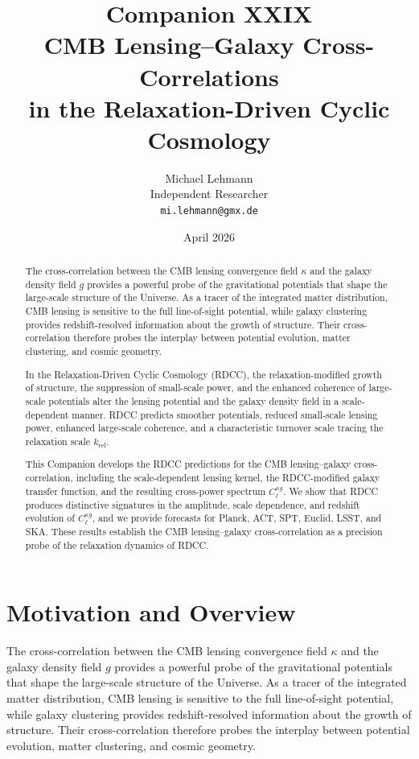 \documentclass[11pt,a4paper]{article}
\title{
\textbf{Companion XXIX}\\[4mm]
\textbf{CMB Lensing–Galaxy Cross-Correlations}\\
\textbf{in the Relaxation-Driven Cyclic Cosmology}
}
\author{
Michael Lehmann\\
Independent Researcher\\
\texttt{mi.lehmann@gmx.de}
}
\date{April 2026}
\begin{document}
\maketitle

\begin{abstract}
The cross-correlation between the CMB lensing convergence field $\kappa$ and the galaxy 
density field $g$ provides a powerful probe of the gravitational potentials that shape the 
large-scale structure of the Universe. As a tracer of the integrated matter distribution, 
CMB lensing is sensitive to the full line-of-sight potential, while galaxy clustering 
provides redshift-resolved information about the growth of structure. Their cross-correlation 
therefore probes the interplay between potential evolution, matter clustering, and cosmic 
geometry.

In the Relaxation-Driven Cyclic Cosmology (RDCC), the relaxation-modified growth of 
structure, the suppression of small-scale power, and the enhanced coherence of large-scale 
potentials alter the lensing potential and the galaxy density field in a scale-dependent 
manner. RDCC predicts smoother potentials, reduced small-scale lensing power, enhanced 
large-scale coherence, and a characteristic turnover scale tracing the relaxation scale 
$k_{\mathrm{rel}}$.

This Companion develops the RDCC predictions for the CMB lensing–galaxy cross-correlation, 
including the scale-dependent lensing kernel, the RDCC-modified galaxy transfer function, 
and the resulting cross-power spectrum $C_{\ell}^{\kappa g}$. We show that RDCC produces 
distinctive signatures in the amplitude, scale dependence, and redshift evolution of 
$C_{\ell}^{\kappa g}$, and we provide forecasts for Planck, ACT, SPT, Euclid, LSST, and SKA. 
These results establish the CMB lensing–galaxy cross-correlation as a precision probe of the 
relaxation dynamics of RDCC.
\end{abstract}

\section{Motivation and Overview}

The cross-correlation between the CMB lensing convergence field $\kappa$ and the galaxy 
density field $g$ provides a powerful probe of the gravitational potentials that shape the 
large-scale structure of the Universe. As a tracer of the integrated matter distribution, 
CMB lensing is sensitive to the full line-of-sight potential, while galaxy clustering 
provides redshift-resolved information about the growth of structure. Their cross-correlation 
therefore probes the interplay between potential evolution, matter clustering, and cosmic 
geometry.
\end{document}
